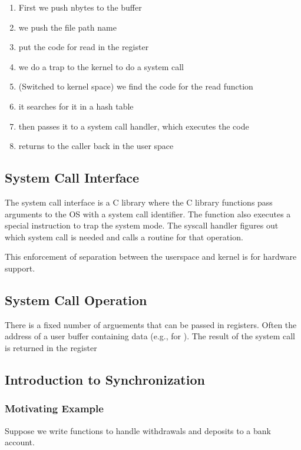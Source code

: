 \documentclass{article}
\begin{document}
\begin{enumerate}
  \item First we push nbytes to the buffer
  \item we push the file path name
  \item put the code for read in the register
  \item we do a trap to the kernel to do a system call
  \item (Switched to kernel space) we find the code for the read function
  \item it searches for it in a hash table
  \item then passes it to a system call handler, which executes the code
  \item returns to the caller back in the user space
\end{enumerate}

\subsection{System Call Interface}

The system call interface is a C library where the C library functions pass arguments to the OS with a system call identifier. The function also executes a special instruction to trap the system mode. The syscall handler figures out which system call is needed and calls a routine for that operation.

This enforcement of separation between the userspace and kernel is for hardware support.


\subsection{System Call Operation}

There is a fixed number of arguements that can be passed in registers. Often the address of a user buffer containing data (e.g., for ). The result of the system call is returned in the register

\subsection{Introduction to Synchronization}

\subsubsection{Motivating Example}

Suppose we write functions to handle withdrawals and deposits to a bank account.
\end{document}
